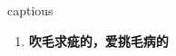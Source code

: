 
\begin{frame}
{\huge captious}
\begin{center}
\begin{enumerate}\Large
  \item \textbf{吹毛求疵的，爱挑毛病的}
\end{enumerate}
\end{center}
\end{frame}
